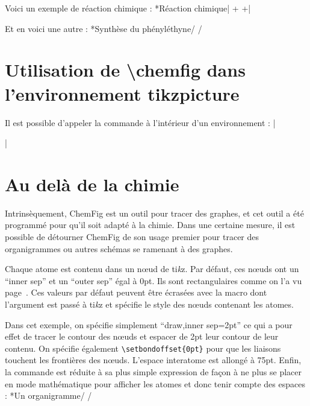 \documentclass[10pt]{article}
\makeatletter
\newcommand\idx{\@ifstar{\let\print@or@not\@gobble\idx@}{\let\print@or@not\@firstofone\idx@}}
\newcommand\idx@[1]{%
	\ifcat\expandafter\noexpand\@car#1\@nil\relax%
		\expandafter\ifx\@car#1\@nil\protect
			\index{#1}%
			\print@or@not{#1}%
		\else
			\saveexpandmode\expandarg
			\StrSubstitute{\string#1}{\string @}{\@empty\protect\symbol{'100}}[\temp@]%
			\StrGobbleLeft\temp@1[\temp@]%
			\restoreexpandmode
			\expandafter\index\expandafter{\temp@ @\protect\texttt{\protect\textbackslash\temp@}}%
			\print@or@not{\texttt{\string#1}}%
		\fi
	\else
		\index{#1}%
		\print@or@not{#1}%
	\fi
}
\newcommand\make@car@active[2]{%
	\catcode`#1\active
	\begingroup
		\lccode`\~`#1\relax
		\lowercase{\endgroup\def~{#2}}%
}
\newif\if@exstar
\newcommand\exemple{%
	\begingroup
	\parskip\z@
	\@makeother\;\@makeother\!\@makeother\?\@makeother\:%
	\@ifstar{\@exstartrue\exemple@}{\@exstarfalse\exemple@}}
\newcommand\exemple@[2][65]{%
	\medbreak\noindent
	\begingroup
		\let\do\@makeother\dospecials
		\make@car@active\ { {}}%
		\make@car@active\^^M{\par\leavevmode}%
		\make@car@active\,{\leavevmode\kern\z@\string,}%
		\make@car@active\-{\leavevmode\kern\z@\string-}%
		\make@car@active\>{\leavevmode\kern\z@\string>}%
		\make@car@active\<{\leavevmode\kern\z@\string<}%
		\exemple@@{#1}{#2}%
}
\newcommand\exemple@@[3]{%
	\def\@tempa##1#3{\exemple@@@{#1}{#2}{##1}}%
	\@tempa
}
\newcommand\exemple@@@[3]{%
	\xdef\the@code{#3}%
	\endgroup
	\if@exstar
		\begingroup
			\fboxrule0.4pt
			\let\breakboxparindent\z@
			\def\bkvz@bottom{\hrule\@height\fboxrule}%
			\let\bkvz@before@breakbox\relax
			\def\bkvz@set@linewidth{\advance\linewidth\dimexpr-2\fboxrule-2\fboxsep}%
			\def\bkvz@left{\vrule\@width\fboxrule\hskip\fboxsep}%
			\def\bkvz@right{\hskip\fboxsep\vrule\@width\fboxrule}%
			\def\bkvz@top{\hbox to \hsize{%
				\vrule\@width\fboxrule\@height\fboxrule
				\leaders\bkvz@bottom\hfill
				\ECFAugie
				\fboxsep\z@
				\colorbox{black}{\kern0.25em\color{white}\footnotesize\lower0.5ex\hbox{\strut#2}\kern0.25em}%
				\leaders\bkvz@bottom\hfill
				\vrule\@width\fboxrule\@height\fboxrule}}%
			\breakbox
				\kern.5ex\relax
				\ttfamily\footnotesize\the@code\par
				\normalfont
				\kern3pt
				\hrule height0.1pt width\linewidth depth0.1pt
				\vskip5pt
				\rightskip0pt plus 1fill
				\everypar{{\color{lightgray}\rlap{\vrule height0.1pt width\linewidth depth0.1pt}}\hskip0pt plus 1fill}%
				\newlinechar`\^^M\everyeof{\noexpand}\scantokens{#3}\par
			\endbreakbox
		\endgroup
	\else
		\vskip0.5ex
		\boxput*(0,1)
			{\fboxsep\z@
			\hbox{\ECFAugie\colorbox{black}{\leavevmode\kern0.25em{\color{white}\footnotesize\strut#2}\kern0.25em}}%
			}%
			{\fboxsep5pt
			\fbox{%
				$\vcenter{\hsize\dimexpr0.#1\linewidth-\fboxsep-\fboxrule\relax
					\kern5pt\parskip0pt \ttfamily\footnotesize\the@code}%
				\vcenter{\kern5pt\hsize\dimexpr\linewidth-0.#1\linewidth-\fboxsep-\fboxrule\relax
					\everypar{{\color{lightgray}\rlap{\vrule height0.1pt width\dimexpr\linewidth-0.#1\linewidth-\fboxsep-\fboxrule depth0.1pt}}}%
					\footnotesize\newlinechar`\^^M\everyeof{\noexpand}\scantokens{#3}}$%
				}%
			}%
	\fi
	\medbreak
	\endgroup
}
\let\do\@makeother\dospecials
\newcommand\CF{{\ECFAugie ChemFig}\xspace}
\newcommand\TIKZ{ti\textit kz\xspace}
\makeatother
\begin{document}
Voici un exemple de réaction chimique :
\exemple*{Réaction chimique}|\setchemrel{0pt}{1.2em}{6em}
\chemsign+
\chemsign+|

Et en voici une autre :
\exemple*{Synthèse du phényléthyne}/
/

\section{Utilisation de {\protect\ttfamily\protect\textbackslash chemfig} dans l'environnement \protect\ttfamily tikzpicture}
Il est possible d'appeler la commande \idx{\chemfig} à l'intérieur d'un environnement {\ttfamily\idx{tikzpicture}} :
\exemple{\textbackslash chemfig dans tikzpicture}||

\section{Au delà de la chimie}\label{style.noeuds}
Intrinsèquement, \CF est un outil pour tracer des graphes, et cet outil a été programmé pour qu'il soit adapté à la chimie. Dans une certaine mesure, il est possible de détourner \CF de son usage premier pour tracer des organigrammes ou autres schémas se ramenant à des graphes.

Chaque atome est contenu dans un nœud de \TIKZ. Par défaut, ces nœuds ont un ``inner sep'' et un ``outer sep'' égal à 0pt. Ils sont rectangulaires comme on l'a vu page~\pageref{longueur.liaison}. Ces valeurs par défaut peuvent être écrasées avec la macro \idx{\setnodestyle} dont l'argument est passé à \TIKZ et spécifie le style des nœuds contenant les atomes.

Dans cet exemple, on spécifie simplement ``draw,inner sep=2pt'' ce qui a pour effet de tracer le contour des nœuds et espacer de 2pt leur contour de leur contenu. On spécifie également \verb-\setbondoffset{0pt}-\idx{\setbondoffset} pour que les liaisons touchent les frontières des nœuds. L'espace interatome est allongé à 75pt. Enfin, la commande \idx{\printatom} est réduite à sa plus simple expression de façon à ne plus se placer en mode mathématique pour afficher les atomes et donc tenir compte des espaces :
\exemple*{Un organigramme}/
\setbondoffset{0pt}
\setatomsep{75pt}
\renewcommand\printatom[1]{#1}
/
\end{document}

